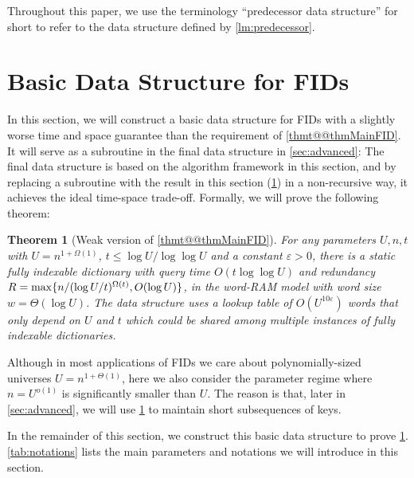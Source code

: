 \documentclass{article}
\theoremstyle{plain}
\newtheorem{theorem}{Theorem}[section]  \newtheorem{lemma}[theorem]{Lemma}
\theoremstyle{definition}  \newtheorem{definition}[theorem]{Definition}
\DeclarePairedDelimiter{\BK}{\{}{\}}
\newcommand{\eps}{\varepsilon}
\begin{document}
Throughout this paper, we use the terminology ``predecessor data structure'' for short to refer to the data structure defined by \cref{lm:predecessor}.

 
\section{Basic Data Structure for FIDs}
\label{sec:simple}

In this section, we will construct a basic data structure for FIDs with a slightly worse time and space guarantee than the requirement of \cref{thmt@@thmMainFID}. It will serve as a subroutine in the final data structure in \cref{sec:advanced}: The final data structure is based on the algorithm framework in this section, and by replacing a subroutine with the result in this section (\cref{thm:simple_FID}) in a non-recursive way, it achieves the ideal time-space trade-off. Formally, we will prove the following theorem:

\begin{theorem}[Weak version of \cref{thmt@@thmMainFID}]
  \label{thm:simple_FID}
  For any parameters $U, n, t$ with $U = n^{1 + \Omega(1)} $, $t \le \log U / \log \log U$ and a constant $\eps > 0$, there is a static fully indexable dictionary with query time $O(t\log \log U)$ and redundancy $R = \max\BK{n/(\log U/t)^{\Omega(t)}, O(\log U)}$, in the word-RAM model with word size $w = \Theta(\log U)$. The data structure uses a lookup table of $O(U^{10\eps})$ words that only depend on $U$ and $t$ which could be shared among multiple instances of fully indexable dictionaries.
\end{theorem}

Although in most applications of FIDs we care about polynomially-sized universes $U = n^{1 + \Theta(1)}$, here we also consider the parameter regime where $n = U^{o(1)}$ is significantly smaller than $U$. The reason is that, later in \cref{sec:advanced}, we will use \cref{thm:simple_FID} to maintain short subsequences of keys.

In the remainder of this section, we construct this basic data structure to prove \cref{thm:simple_FID}. \cref{tab:notations} lists the main parameters and notations we will introduce in this section.
\end{document}
